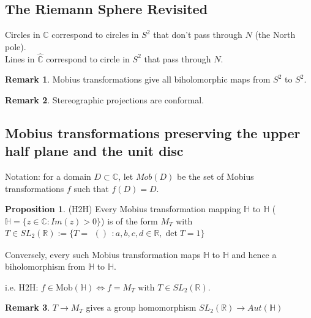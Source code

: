 \documentclass[12pt,a4paper]{article}
\theoremstyle{definition}
\newtheorem{proposition}[definition]{Proposition}
\newtheorem*{remark}{Remark}
\begin{document}
\subsection{The Riemann Sphere Revisited}

Circles in $\hat{\mathbb{C}}$ correspond to circles in $S^2$ that don't pass through $N$ (the North pole).
\\
Lines in $\hat{\mathbb{C}}$ correspond to circle in $S^2$ that pass through $N$.

\begin{remark}
	Mobius transformations give all biholomorphic maps from $S^2$ to $S^2$.
\end{remark}

\begin{remark}
	Stereographic projections are conformal.
\end{remark}

\subsection{Mobius transformations preserving the upper half plane and the unit disc}

Notation: for a domain $D \subset \mathbb{C}$, let $Mob(D)$ be the set of Mobius transformations $f$ such that $f(D) = D$.

\begin{proposition}
	(H2H) Every Mobius transformation mapping $\mathbb{H}$ to $\mathbb{H}$ ($\mathbb{H} = \{ z \in \mathbb{C}: Im(z) > 0\}$) is of the form $M_T$ with $T \in SL_2 (\mathbb{R}) := \{T = \begin{matrix}
		()
	\end{matrix}: a, b, c, d \in \mathbb{R}, \det T = 1\}$
	
	Conversely, every such Mobius transformation maps $\mathbb{H}$ to $\mathbb{H}$ and hence a biholomorphism from $\mathbb{H}$ to $\mathbb{H}$.

	i.e. H2H: $f \in \text{Mob}(\mathbb{H}) \Leftrightarrow f = M_T$ with $T \in SL_2 (\mathbb{R})$.
\end{proposition}

\begin{remark}
	$T \rightarrow M_T$ gives a group homomorphism $SL_2 (\mathbb{R}) \rightarrow Aut(\mathbb{H})$
\end{remark}
\end{document}
